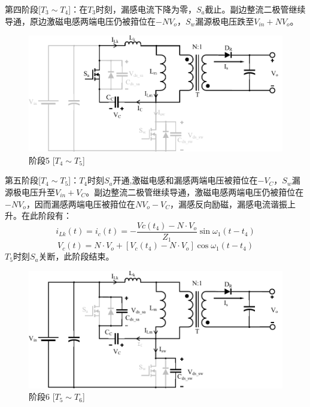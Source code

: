 \documentclass[UTF8]{ctexart}
\numberwithin{equation}{section}
\begin{document}
	第四阶段[$T_3 \sim T_4$]：在$T_3$时刻，漏感电流下降为零，$S_a$截止。副边整流二极管继续导通，原边激磁电感两端电压仍被箝位在$-NV_o$，$S_w$漏源极电压跌至$V_{in}+NV_o$。
	
	\begin{figure}[h]
		\centering
		\includegraphics[scale=0.5]{image/mo5.pdf}
		\caption{阶段5 [$T_4 \sim T_5$]}
	\end{figure}
	
	第五阶段[$T_4 \sim T_5$]：$T_4$时刻$S_a$开通,激磁电感和漏感两端电压被箝位在$-V_C$，$S_w$漏源极电压升至$V_{in}+V_C$。副边整流二极管继续导通，激磁电感两端电压仍被箝位在$-NV_o$，因而漏感两端电压被箝位在$NV_o-V_C$，漏感反向励磁，漏感电流谐振上升。在此阶段有：
	\begin{equation}
	i_{Lk}(t)=i_{c}(t)=-\frac{V c\left(t_{4}\right)-N \cdot V_o}{Z_{1}} \sin \omega_{1}\left(t-t_{4}\right)
	\end{equation}
	\begin{equation}
	V_c(t)=N \cdot V_o+\left[V_c\left(t_{4}\right)-N \cdot V_o\right] \cos \omega_{1}\left(t-t_{4}\right)
	\end{equation}
	$T_5$时刻$S_a$关断，此阶段结束。
	
	\begin{figure}[h]
		\centering
		\includegraphics[scale=0.5]{image/mo6.pdf}
		\caption{阶段6 [$T_5 \sim T_6$]}
	\end{figure}
	
\end{document}
